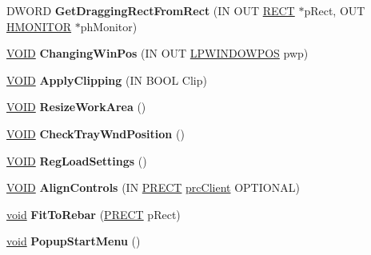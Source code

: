 \begin{DoxyCompactItemize}
\item 
\mbox{\label{class_c_tray_window_acb5034847fae37d8b60a0c1b2f7e60c1}} 
D\+W\+O\+RD {\bfseries Get\+Dragging\+Rect\+From\+Rect} (IN O\+UT \hyperlink{structtag_r_e_c_t}{R\+E\+CT} $\ast$p\+Rect, O\+UT \hyperlink{interfacevoid}{H\+M\+O\+N\+I\+T\+OR} $\ast$ph\+Monitor)
\item 
\mbox{\label{class_c_tray_window_af49d2a36dca7282b46f05b185d92e658}} 
\hyperlink{interfacevoid}{V\+O\+ID} {\bfseries Changing\+Win\+Pos} (IN O\+UT \hyperlink{struct___w_i_n_d_o_w_p_o_s}{L\+P\+W\+I\+N\+D\+O\+W\+P\+OS} pwp)
\item 
\mbox{\label{class_c_tray_window_a7ee0f1367ecd184ed465981daf762057}} 
\hyperlink{interfacevoid}{V\+O\+ID} {\bfseries Apply\+Clipping} (IN B\+O\+OL Clip)
\item 
\mbox{\label{class_c_tray_window_a111b788fa26897182aec16734c0ac303}} 
\hyperlink{interfacevoid}{V\+O\+ID} {\bfseries Resize\+Work\+Area} ()
\item 
\mbox{\label{class_c_tray_window_a995a759d471872ca5da4d300f189c3cc}} 
\hyperlink{interfacevoid}{V\+O\+ID} {\bfseries Check\+Tray\+Wnd\+Position} ()
\item 
\mbox{\label{class_c_tray_window_a5d11770fdaa7b32d43778d312b254cfe}} 
\hyperlink{interfacevoid}{V\+O\+ID} {\bfseries Reg\+Load\+Settings} ()
\item 
\mbox{\label{class_c_tray_window_aa7d9a17d226f01a9e12bff2f1e8f7b9f}} 
\hyperlink{interfacevoid}{V\+O\+ID} {\bfseries Align\+Controls} (IN \hyperlink{structtag_r_e_c_t}{P\+R\+E\+CT} \hyperlink{structtag_r_e_c_t}{prc\+Client} O\+P\+T\+I\+O\+N\+AL)
\item 
\mbox{\label{class_c_tray_window_a2af82b588af509d8594d6c0748d62197}} 
\hyperlink{interfacevoid}{void} {\bfseries Fit\+To\+Rebar} (\hyperlink{structtag_r_e_c_t}{P\+R\+E\+CT} p\+Rect)
\item 
\mbox{\label{class_c_tray_window_a9d9a6347b3b85991f4f831d969c10b48}} 
\hyperlink{interfacevoid}{void} {\bfseries Popup\+Start\+Menu} ()

\end{DoxyCompactItemize}

